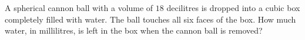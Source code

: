 A spherical cannon ball with a volume of $18$ decilitres is dropped into a cubic box completely filled with water. The ball touches all six faces of the box. How much water, in millilitres, is left in the box when the cannon ball is removed?
